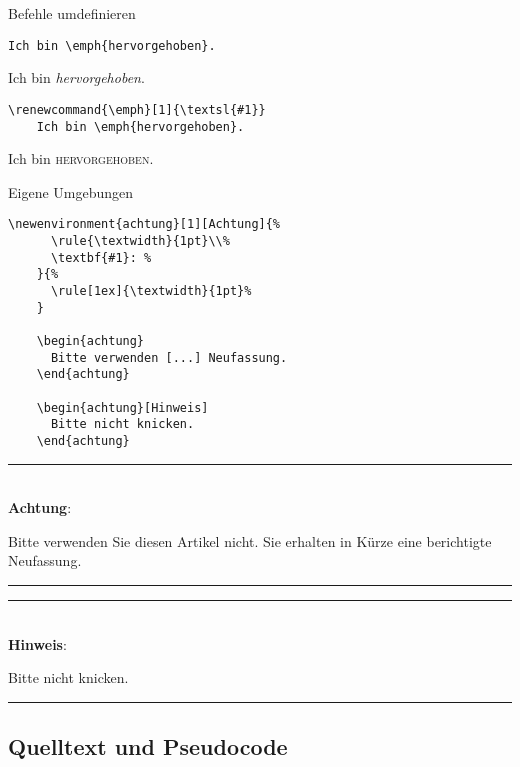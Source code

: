 \begin{Frame}[fragile]{Befehle umdefinieren}
  \begin{lstlisting}[gobble=4]
    Ich bin \emph{hervorgehoben}.
  \end{lstlisting}
  Ich bin \emph{hervorgehoben}.

  \xxx

  \begin{lstlisting}[gobble=4]
    \renewcommand{\emph}[1]{\textsl{#1}}
    Ich bin \emph{hervorgehoben}.
  \end{lstlisting}
  \renewcommand{\emph}[1]{\textsc{#1}}
  Ich bin \emph{hervorgehoben}.
\end{Frame}

\begin{Frame}[fragile]{Eigene Umgebungen}
  \begin{lstlisting}[gobble=4]
    \newenvironment{achtung}[1][Achtung]{%
      \rule{\textwidth}{1pt}\\%
      \textbf{#1}: %
    }{%
      \rule[1ex]{\textwidth}{1pt}%
    }

    \begin{achtung}
      Bitte verwenden [...] Neufassung.
    \end{achtung}
  
    \begin{achtung}[Hinweis]
      Bitte nicht knicken.
    \end{achtung}
  \end{lstlisting}
  \newenvironment{achtung}[1][Achtung]{%
    \rule{\textwidth}{1pt}\\%
    \textbf{#1}: %
  }{%
    \rule[1ex]{\textwidth}{1pt}%
  }

  \begin{achtung}
    Bitte verwenden Sie diesen Artikel nicht.
    Sie erhalten in Kürze eine berichtigte Neufassung.
  \end{achtung}

  \begin{achtung}[Hinweis]
    Bitte nicht knicken.
  \end{achtung}

\end{Frame}

\subsection{Quelltext und Pseudocode}

